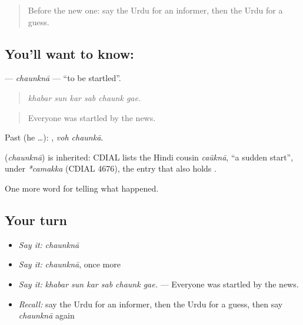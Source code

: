 \begin{quote}
Before the new one: say the Urdu for an informer, then the Urdu for a guess.
\end{quote}

\subsection*{You'll want to know: }
\textbf{} — \emph{chaunknā} — \textquotedblleft{}to be startled\textquotedblright{}.

\begin{quote}
     
\end{quote}

\begin{quote}
\emph{khabar sun kar sab chaunk gae.}
\end{quote}

\begin{quote}
Everyone was startled by the news.
\end{quote}

Past (he …):  , \emph{voh chaunkā}.

\begin{cousinweb}
\textbf{} (\emph{chaunknā}) is inherited: CDIAL lists the Hindi cousin \emph{caũknā}, \textquotedblleft{}a sudden start\textquotedblright{}, under \emph{*camakka} (CDIAL 4676), the entry that also holds \textbf{}.
\end{cousinweb}

\begin{grammarlens}[title={What you've built}]
One more word for telling what happened.
\end{grammarlens}

\subsection*{Your turn}
\begin{itemize}
\raggedright
  \item \emph{Say it:} \emph{chaunknā}
  \item \emph{Say it:} \emph{chaunknā}, once more
  \item \emph{Say it:} \emph{khabar sun kar sab chaunk gae.} — Everyone was startled by the news.
  \item \emph{Recall:} say the Urdu for an informer, then the Urdu for a guess, then say \emph{chaunknā} again
\end{itemize}

